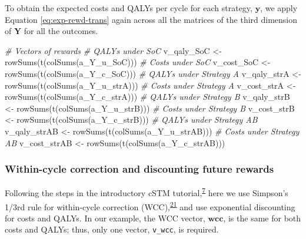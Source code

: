 \documentclass[
]{article}
\newenvironment{Shaded}{\begin{snugshade}}{\end{snugshade}}
\newcommand{\CommentTok}[1]{\textcolor[rgb]{0.56,0.35,0.01}{\textit{#1}}}
\newcommand{\FunctionTok}[1]{\textcolor[rgb]{0.00,0.00,0.00}{#1}}
\newcommand{\NormalTok}[1]{#1}
\newcommand{\OtherTok}[1]{\textcolor[rgb]{0.56,0.35,0.01}{#1}}
\begin{document}
To obtain the expected costs and QALYs per cycle for each strategy, \(\mathbf{y}\), we apply Equation \eqref{eq:exp-rewd-trans} again across all the matrices of the third dimension of \(\mathbf{Y}\) for all the outcomes.

\begin{Shaded}
\begin{Highlighting}[]
\CommentTok{\# Vectors of rewards}
\CommentTok{\# QALYs under SoC}
\NormalTok{v\_qaly\_SoC }\OtherTok{\textless{}{-}} \FunctionTok{rowSums}\NormalTok{(}\FunctionTok{t}\NormalTok{(}\FunctionTok{colSums}\NormalTok{(a\_Y\_u\_SoC)))}
\CommentTok{\# Costs under SoC}
\NormalTok{v\_cost\_SoC }\OtherTok{\textless{}{-}} \FunctionTok{rowSums}\NormalTok{(}\FunctionTok{t}\NormalTok{(}\FunctionTok{colSums}\NormalTok{(a\_Y\_c\_SoC)))}
\CommentTok{\# QALYs under Strategy A}
\NormalTok{v\_qaly\_strA }\OtherTok{\textless{}{-}} \FunctionTok{rowSums}\NormalTok{(}\FunctionTok{t}\NormalTok{(}\FunctionTok{colSums}\NormalTok{(a\_Y\_u\_strA)))}
\CommentTok{\# Costs under Strategy A}
\NormalTok{v\_cost\_strA }\OtherTok{\textless{}{-}} \FunctionTok{rowSums}\NormalTok{(}\FunctionTok{t}\NormalTok{(}\FunctionTok{colSums}\NormalTok{(a\_Y\_c\_strA)))}
\CommentTok{\# QALYs under Strategy B}
\NormalTok{v\_qaly\_strB }\OtherTok{\textless{}{-}} \FunctionTok{rowSums}\NormalTok{(}\FunctionTok{t}\NormalTok{(}\FunctionTok{colSums}\NormalTok{(a\_Y\_u\_strB)))}
\CommentTok{\# Costs under Strategy B}
\NormalTok{v\_cost\_strB }\OtherTok{\textless{}{-}} \FunctionTok{rowSums}\NormalTok{(}\FunctionTok{t}\NormalTok{(}\FunctionTok{colSums}\NormalTok{(a\_Y\_c\_strB)))}
\CommentTok{\# QALYs under Strategy AB}
\NormalTok{v\_qaly\_strAB }\OtherTok{\textless{}{-}} \FunctionTok{rowSums}\NormalTok{(}\FunctionTok{t}\NormalTok{(}\FunctionTok{colSums}\NormalTok{(a\_Y\_u\_strAB)))}
\CommentTok{\# Costs under Strategy AB}
\NormalTok{v\_cost\_strAB }\OtherTok{\textless{}{-}} \FunctionTok{rowSums}\NormalTok{(}\FunctionTok{t}\NormalTok{(}\FunctionTok{colSums}\NormalTok{(a\_Y\_c\_strAB)))}
\end{Highlighting}
\end{Shaded}

\hypertarget{within-cycle-correction-and-discounting-future-rewards}{%
\subsubsection{Within-cycle correction and discounting future rewards}\label{within-cycle-correction-and-discounting-future-rewards}}

Following the steps in the introductory cSTM tutorial,\textsuperscript{\protect\hyperlink{ref-Alarid-Escudero2021a}{7}} here we use Simpson's 1/3rd rule for within-cycle correction (WCC),\textsuperscript{\protect\hyperlink{ref-Elbasha2016a}{21}} and use exponential discounting for costs and QALYs. In our example, the WCC vector, \(\mathbf{wcc}\), is the same for both costs and QALYs; thus, only one vector, \texttt{v\_wcc}, is required.
\end{document}
